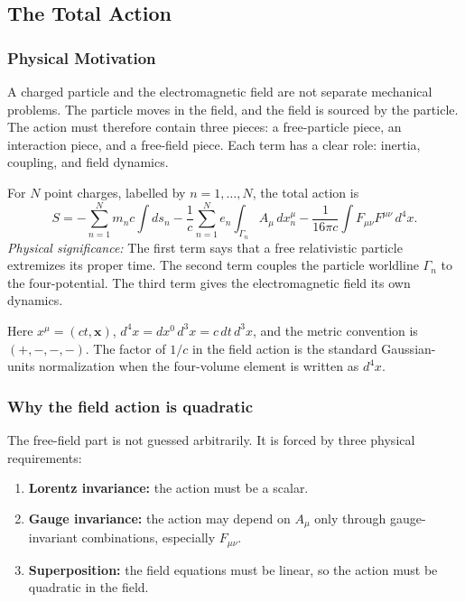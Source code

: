 \subsection{The Total Action}\label{subsec:lec09-total-action}

\subsubsection*{Physical Motivation}
A charged particle and the electromagnetic field are not separate mechanical
problems.  The particle moves in the field, and the field is sourced by the
particle.  The action must therefore contain three pieces: a free-particle
piece, an interaction piece, and a free-field piece.  Each term has a clear
role: inertia, coupling, and field dynamics.

For $N$ point charges, labelled by $n=1,\ldots,N$, the total action is
\begin{equation}\label{eq:lec09-total-action}
  \boxed{
  S =
  -\sum_{n=1}^N m_n c\int ds_n
  -\frac{1}{c}\sum_{n=1}^N e_n\int_{\Gamma_n} A_\mu\,dx_n^\mu
  -\frac{1}{16\pi c}\int F_{\mu\nu}F^{\mu\nu}\,d^4x .
  }
\end{equation}
\textit{Physical significance:} The first term says that a free relativistic
particle extremizes its proper time.  The second term couples the particle
worldline $\Gamma_n$ to the four-potential.  The third term gives the
electromagnetic field its own dynamics.

Here $x^\mu=(ct,\mathbf{x})$, $d^4x=dx^0\,d^3x=c\,dt\,d^3x$, and the metric
convention is $(+,-,-,-)$.  The factor of $1/c$ in the field action is the
standard Gaussian-units normalization when the four-volume element is written
as $d^4x$.

\subsubsection*{Why the field action is quadratic}

The free-field part is not guessed arbitrarily.  It is forced by three physical
requirements:
\begin{enumerate}
  \item \textbf{Lorentz invariance:} the action must be a scalar.
  \item \textbf{Gauge invariance:} the action may depend on $A_\mu$ only through
  gauge-invariant combinations, especially $F_{\mu\nu}$.
  \item \textbf{Superposition:} the field equations must be linear, so the
  action must be quadratic in the field.
\end{enumerate}

